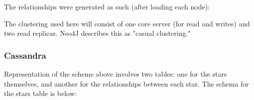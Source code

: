 The relationships were generated as such (after loading each node):

The clustering used here will consist of one core server (for read and writes) and two read replicas.
Neo4J describes this as "casual clustering."

\subsubsection{Cassandra}
Representation of the scheme above involves two tables: one for the stars themselves, and another for the relationships
between each star.
The schema for the stars table is below:
%
